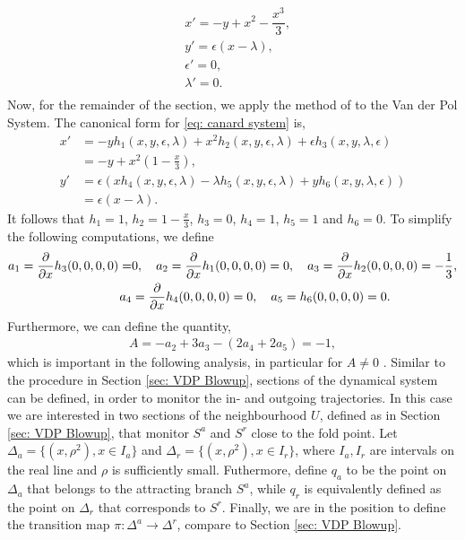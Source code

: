 \begin{equation}
\begin{aligned}
&x'=-y+x^2-\dfrac{x^3}{3},\\
&y'=\epsilon(x-\lambda),\\
&\epsilon'=0,\\
&\lambda'=0.\\
\end{aligned}
\label{eq: extended canard system}
\end{equation}
Now, for the remainder of the section, we apply the method of \citet{krupa2001} to the Van der Pol System. The canonical form for \ref{eq: canard system} is,
\begin{equation} \label{canardysy2var}
	\begin{aligned}
		x'&=-yh_1(x,y,\epsilon,\lambda)+x^2h_2(x,y,\epsilon,\lambda) + \epsilon h_3(x,y,\lambda,\epsilon)\\
                        &= -y + x^2 \left( 1- \frac{x}{3} \right),\\
		y'&=\epsilon(xh_4(x,y,\epsilon,\lambda)-\lambda h_5(x,y,\epsilon,\lambda) + y h_6(x,y,\lambda,\epsilon)) \\
                        &= \epsilon( x- \lambda).
	\end{aligned}
\end{equation}
It follows that $h_1 = 1$, $h_2 = 1-\frac{x}{3}$, $h_3=0$, $h_4 =1$, $h_5=1$ and $h_6=0$.
To simplify the following computations, we define
\begin{align*}
a_1=\pd{}{x}h_3(0,0,0,0)=& 0, \ \ \
a_2=\pd{}{x}h_1(0,0,0,0)= 0,\ \ \ 
a_3=\pd{}{x}h_2(0,0,0,0)=-\frac{1}{3},\\
a_4&=\pd{}{x}h_4(0,0,0,0)=0,\ \ \
a_5=h_6(0,0,0,0)=0.
\end{align*}
Furthermore, we can define the quantity,
\begin{align*}
A=-a_2+3a_3-(2a_4+2a_5)=-1,
\end{align*}
which is important in the following analysis, in particular for $A \neq 0$ \citep{krupa2001}. 
Similar to the procedure in Section \ref{sec: VDP Blowup}, sections of the dynamical system can be defined, in order to monitor the in- and outgoing trajectories. In this case we are interested in two sections of the neighbourhood $U$, defined as in Section \ref{sec: VDP Blowup}, that monitor $S^a$ and $S^r$ close to the fold point.
Let $ \Delta_a = \{ (x,\rho^2), x \in  I_a \}$ and $\Delta_r= \{ (x,\rho^2), x \in  I_r \}$, where $I_a,I_r$ are intervals on the real line and $\rho$ is sufficiently small.
Futhermore, define $q_a$ to be the point on $\Delta_a$ that belongs to the attracting branch $S^a$, while $q_r$ is equivalently defined as the point on $\Delta_r$ that corresponds to $S^r$. Finally, we are in the position to define the transition map $\pi: \Delta^a \to \Delta^r$, compare to Section \ref{sec: VDP Blowup}.
